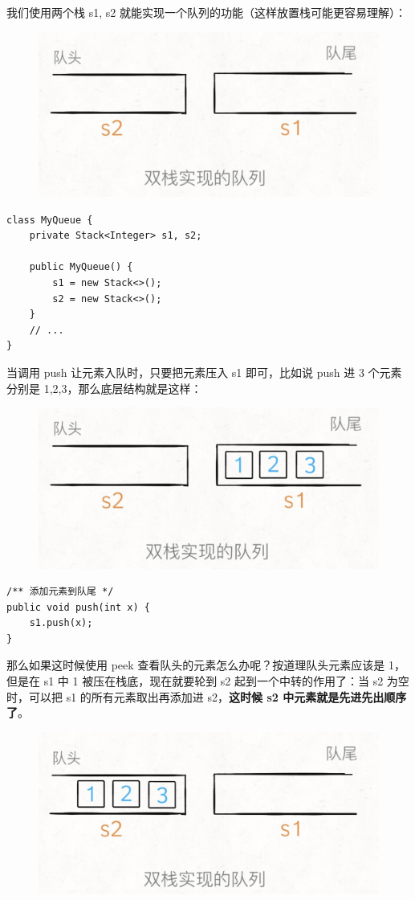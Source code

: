 \documentclass[12pt]{article}
\begin{document}
我们使用两个栈 s1, s2 就能实现一个队列的功能（这样放置栈可能更容易理解）：
\begin{figure}[H]
    \centering
    \includegraphics[width=.5\textwidth]{fig/Queue_Stack_Implementation_1.png}
\end{figure}

\begin{lstlisting}
class MyQueue {
    private Stack<Integer> s1, s2;
    
    public MyQueue() {
        s1 = new Stack<>();
        s2 = new Stack<>();
    }
    // ...
}
\end{lstlisting}

当调用 push 让元素入队时，只要把元素压入 s1 即可，比如说 push 进 3 个元素分别是 1,2,3，那么底层结构就是这样：
\begin{figure}[H]
    \centering
    \includegraphics[width=.5\textwidth]{fig/Queue_Stack_Implementation_2.png}
\end{figure}

\begin{lstlisting}
/** 添加元素到队尾 */
public void push(int x) {
    s1.push(x);
}
\end{lstlisting}

那么如果这时候使用 peek 查看队头的元素怎么办呢？按道理队头元素应该是 1，但是在 s1 中 1 被压在栈底，现在就要轮到 s2 起到一个中转的作用了：当 s2 为空时，可以把 s1 的所有元素取出再添加进 s2，\textbf{这时候 s2 中元素就是先进先出顺序了}。
\begin{figure}[H]
    \centering
    \includegraphics[width=.5\textwidth]{fig/Queue_Stack_Implementation_3.png}
\end{figure}
\end{document}
